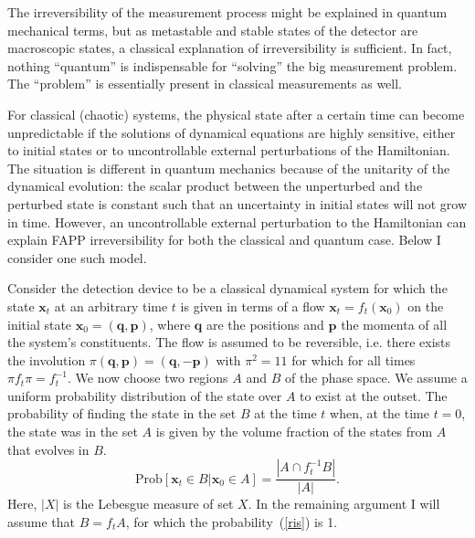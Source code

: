 \documentclass[12pt,a4]{article}
\newcommand{\unit}{1\!\!1}
\begin{document}
The irreversibility of the measurement process might be explained in quantum mechanical terms, but as metastable and stable states of the detector are macroscopic states, a classical explanation of irreversibility is sufficient. In fact, nothing ``quantum'' is indispensable for ``solving'' the big measurement problem. The ``problem'' is essentially present in classical measurements as well.

For classical (chaotic) systems, the physical state after a certain time can become unpredictable if the solutions of dynamical equations are highly sensitive, either to initial states or to uncontrollable external perturbations of the Hamiltonian. The situation is different in quantum mechanics because of the unitarity of the dynamical evolution: the scalar product between the unperturbed and the perturbed state is constant such that an uncertainty in initial states will not grow in time. However, an uncontrollable external perturbation to the Hamiltonian can explain FAPP irreversibility for both the classical and quantum case. Below I consider one such model. 

Consider the detection device to be a classical dynamical system for which the state $\mathbf{x}_t$ at an arbitrary time $t$ is given in terms of a flow $\mathbf{x}_t = f_t(\mathbf{x}_0)$ on the initial state $\mathbf{x}_0 = (\mathbf{q},\mathbf{p})$, where $\mathbf{q}$ are the positions and $\mathbf{p}$ the momenta of all the system's constituents. The flow is assumed to be reversible, i.e. there exists the involution $\pi(\mathbf{q},\mathbf{p})=(\mathbf{q},-\mathbf{p})$ with $\pi^2=\unit$ for which for all times $\pi f_t \pi =f^{-1}_t$. We now choose two regions $A$ and $B$ of the phase space. We assume a uniform probability distribution of the state over $A$ to exist at the outset. The probability of finding the state in the set $B$ at the time $t$ when, at the time $t = 0$, the state was in the set $A$ is given by the volume fraction of the states from $A$ that evolves in $B$.
\begin{equation}
\mbox{Prob}[\mathbf{x}_t \in B| \mathbf{x}_0 \in A] = \frac{|A \cap f^{-1}_t B|}{|A|}. \label{ris}
\end{equation}
Here, $|X|$ is the Lebesgue measure of set $X$. In the remaining argument I will assume that $B = f_t A$, for which the probability~(\ref{ris}) is 1. 
\end{document}
